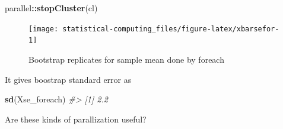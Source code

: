 \documentclass[]{book}
\newenvironment{Shaded}{\begin{snugshade}}{\end{snugshade}}
\newcommand{\CommentTok}[1]{\textcolor[rgb]{0.56,0.35,0.01}{\textit{#1}}}
\newcommand{\DataTypeTok}[1]{\textcolor[rgb]{0.13,0.29,0.53}{#1}}
\newcommand{\DecValTok}[1]{\textcolor[rgb]{0.00,0.00,0.81}{#1}}
\newcommand{\KeywordTok}[1]{\textcolor[rgb]{0.13,0.29,0.53}{\textbf{#1}}}
\newcommand{\NormalTok}[1]{#1}
\newcommand{\OperatorTok}[1]{\textcolor[rgb]{0.81,0.36,0.00}{\textbf{#1}}}
\newcommand{\StringTok}[1]{\textcolor[rgb]{0.31,0.60,0.02}{#1}}
\theoremstyle{definition}
\theoremstyle{definition}
\theoremstyle{definition}
\theoremstyle{remark}
\begin{document}
\begin{Shaded}
\begin{Highlighting}[]
\NormalTok{parallel}\OperatorTok{::}\KeywordTok{stopCluster}\NormalTok{(cl)}
\end{Highlighting}
\end{Shaded}

\begin{Shaded}
\end{Shaded}

\begin{figure}[H]

{\centering \texttt{[image: statistical-computing\_files/figure-latex/xbarsefor-1]} 

}

\caption{Bootstrap replicates for sample mean done by foreach}\label{fig:xbarsefor}
\end{figure}

It gives boostrap standard error as

\begin{Shaded}
\begin{Highlighting}[]
\KeywordTok{sd}\NormalTok{(Xse_foreach)}
\CommentTok{#> [1] 2.2}
\end{Highlighting}
\end{Shaded}

Are these kinds of parallization useful?
\end{document}
